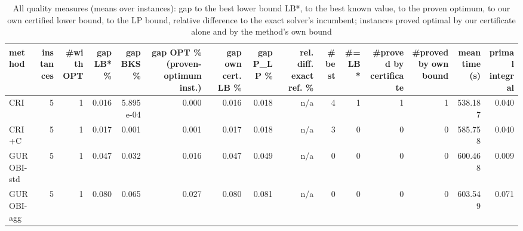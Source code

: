 \begin{table}[htbp]
\centering
\small
\caption{All quality measures (means over instances): gap to the best lower bound LB*, to the best known value, to the proven optimum, to our own certified lower bound, to the LP bound, relative difference to the exact solver's incumbent; instances proved optimal by our certificate alone and by the method's own bound}
\label{tab:E3x_long_runs_xlarge_b600_all_metrics}
\begin{tabular}{lrrrrrrrrrrrrrr}
\toprule
method & instances & \#with OPT & gap LB* \% & gap BKS \% & gap OPT \% (proven-optimum inst.) & gap own cert. LB \% & gap P\_LP \% & rel. diff. exact ref. \% & \#best & \#= LB* & \#proved by certificate & \#proved by own bound & mean time (s) & primal integral \\
\midrule
CRI & 5 & 1 & 0.016 & 5.895e-04 & 0.000 & 0.016 & 0.018 & n/a & 4 & 1 & 1 & 1 & 538.187 & 0.040 \\
CRI+C & 5 & 1 & 0.017 & 0.001 & 0.001 & 0.017 & 0.018 & n/a & 3 & 0 & 0 & 0 & 585.758 & 0.040 \\
GUROBI-std & 5 & 1 & 0.047 & 0.032 & 0.016 & 0.047 & 0.049 & n/a & 0 & 0 & 0 & 0 & 600.468 & 0.009 \\
GUROBI-agg & 5 & 1 & 0.080 & 0.065 & 0.027 & 0.080 & 0.081 & n/a & 0 & 0 & 0 & 0 & 603.549 & 0.071 \\
\bottomrule
\end{tabular}
\end{table}
